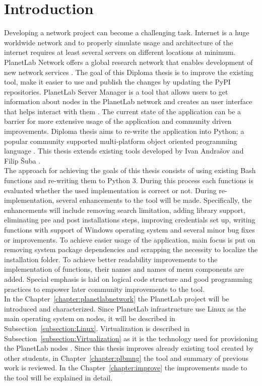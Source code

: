 \chapter*{Introduction}
{}

Developing a network project can become a challenging task. Internet is a huge worldwide network and to properly simulate usage and architecture of the internet requires at least several servers on different locations at minimum. PlanetLab Network offers a global research network that enables development of new network services \cite{planetlababout}. The goal of this Diploma thesis is to improve the existing tool, make it easier to use and publish the changes by updating the PyPI repositories. PlanetLab Server Manager is a tool that allows users to get information about nodes in the PlanetLab network and creates an user interface that helps interact with them \cite{andrasov2}. The current state of the application can be a barrier for more extensive usage of the application and community driven improvements. Diploma thesis aims to re-write the application into Python; a popular community supported multi-platform object oriented programming language \cite{lutz2013learning}. This thesis extends existing tools developed by Ivan Andrašov \cite{andrasov2} and Filip Šuba \cite{suba1}.\\
The approach for achieving the goals of this thesis consists of using existing Bash functions and re-writing them to Python 3. During this process each functions is evaluated whether the used implementation is correct or not. During re-implementation, several enhancements to the tool will be made. Specifically, the enhancements will include removing search limitation, adding library support, eliminating pre and post installations steps, improving credentials set up, writing functions with support of Windows operating system and several minor bug fixes or improvements. To achieve easier usage of the application, main focus is put on removing system package dependencies and scrapping the necessity to localize the installation folder. To achieve better readability improvements to the implementation of functions, their names and names of menu components are added. Special emphasis is laid on logical code structure and good programming practices to empower later community improvements to the tool.\\
In the Chapter~\ref{chapter:planetlabnetwork} the PlanetLab project will be introduced and characterized. Since PlanetLab infrastructure use Linux as the main operating system on nodes, it will be described in Subsection~\ref{subsection:Linux}. Virtualization is described in Subsection~\ref{subsection:Virtualization} as it is the technology used for provisioning the PlanetLab nodes \cite{planetlababout}. Since this thesis improves already existing tool created by other students, in Chapter~\ref{chapter:plbmng} the tool and summary of previous work is reviewed. In the Chapter~\ref{chapter:improve} the improvements made to the tool will be explained in detail.
